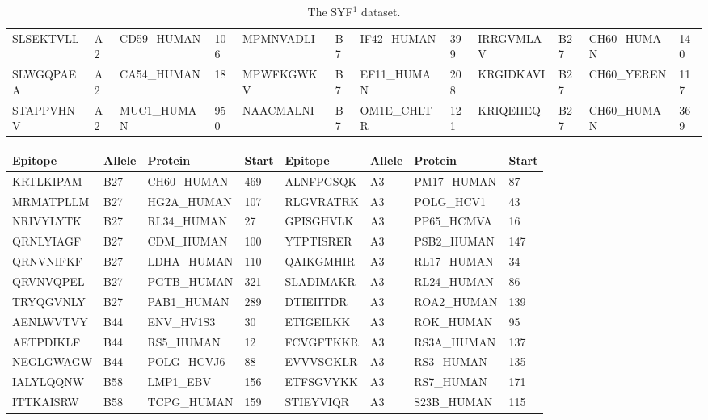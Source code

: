 \begin{table}[htp]
\begin{center}
\begin{sideways}
{\begin{tabulary}{1.5\textwidth}{|l|l|l|l|l|l|l|l|l|l|l|l|}
SLSEKTVLL & A2 & CD59\_HUMAN & 106 & MPMNVADLI & B7 & IF42\_HUMAN & 399 & IRRGVMLAV & B27 & CH60\_HUMAN & 140 \\
SLWGQPAEA & A2 & CA54\_HUMAN & 18 & MPWFKGWKV & B7 & EF11\_HUMAN & 208 & KRGIDKAVI & B27 & CH60\_YEREN & 117 \\
STAPPVHNV & A2 & MUC1\_HUMAN & 950 & NAACMALNI & B7 & OM1E\_CHLTR & 121 & KRIQEIIEQ & B27 & CH60\_HUMAN & 369 \bigstrut[b] \\
\hline
\end{tabulary}
}
\end{sideways}
\end{center}
\caption[The SYF$^1$ dataset]{The SYF$^1$ dataset.}\label{appendixa/table1}
\end{table}

\begin{table}[htp]
\begin{center}
\begin{sideways}
{
\scriptsize
\begin{tabulary}{1.5\textwidth}{|l|l|l|l|l|l|l|l|}
\hline
Epitope & Allele & Protein & Start & Epitope & Allele & Protein & Start \bigstrut \\
\hline
KRTLKIPAM & B27 & CH60\_HUMAN & 469 & ALNFPGSQK & A3 & PM17\_HUMAN & 87 \bigstrut[t] \\
MRMATPLLM & B27 & HG2A\_HUMAN & 107 & RLGVRATRK & A3 & POLG\_HCV1 & 43 \\
NRIVYLYTK & B27 & RL34\_HUMAN & 27 & GPISGHVLK & A3 & PP65\_HCMVA & 16 \\
QRNLYIAGF & B27 & CDM\_HUMAN & 100 & YTPTISRER & A3 & PSB2\_HUMAN & 147 \\
QRNVNIFKF & B27 & LDHA\_HUMAN & 110 & QAIKGMHIR & A3 & RL17\_HUMAN & 34 \\
QRVNVQPEL & B27 & PGTB\_HUMAN & 321 & SLADIMAKR & A3 & RL24\_HUMAN & 86 \\
TRYQGVNLY & B27 & PAB1\_HUMAN & 289 & DTIEIITDR & A3 & ROA2\_HUMAN & 139 \\
AENLWVTVY & B44 & ENV\_HV1S3 & 30 & ETIGEILKK & A3 & ROK\_HUMAN & 95 \\
AETPDIKLF & B44 & RS5\_HUMAN & 12 & FCVGFTKKR & A3 & RS3A\_HUMAN & 137 \\
NEGLGWAGW & B44 & POLG\_HCVJ6 & 88 & EVVVSGKLR & A3 & RS3\_HUMAN & 135 \\
IALYLQQNW & B58 & LMP1\_EBV & 156 & ETFSGVYKK & A3 & RS7\_HUMAN & 171 \\
ITTKAISRW & B58 & TCPG\_HUMAN & 159 & STIEYVIQR & A3 & S23B\_HUMAN & 115 \\

\end{tabulary}}
\end{sideways}
\end{center}
\end{table}
